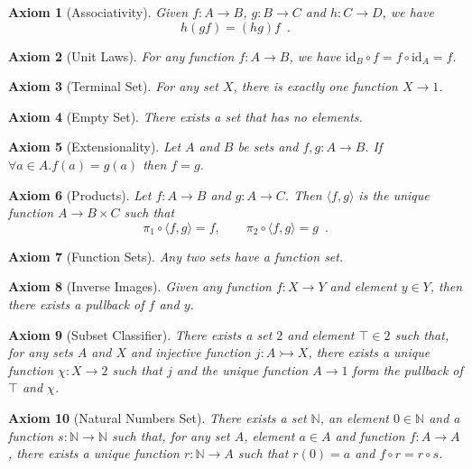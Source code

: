 \documentclass{book}
\newtheorem{ax}{Axiom}[chapter]
\theoremstyle{definition}
\newcommand{\id}[1]{\ensuremath{\mathrm{id}_{#1}}}
\begin{document}
\begin{ax}[Associativity]
Given $f : A \rightarrow B$, $g : B \rightarrow C$ and $h : C \rightarrow D$, we have
\[ h (gf) = (hg) f \enspace . \]
\end{ax}

\begin{ax}[Unit Laws]
For any function $f : A \rightarrow B$, we have $\id{B} \circ f = f \circ \id{A} = f$.
\end{ax}

\begin{ax}[Terminal Set]
For any set $X$, there is exactly one function $X \rightarrow 1$.
\end{ax}

\begin{ax}[Empty Set]
There exists a set that has no elements.
\end{ax}

\begin{ax}[Extensionality]
Let $A$ and $B$ be sets and $f,g : A \rightarrow B$.
If $\forall a \in A. f(a) = g(a)$ then $f = g$. \end{ax}

\begin{ax}[Products]
Let $f : A \rightarrow B$ and $g : A \rightarrow C$. Then $\langle f,g \rangle$ is the unique function $A \rightarrow B \times C$ such that
\[ \pi_1 \circ \langle f,g \rangle = f, \qquad \pi_2 \circ \langle f,g \rangle = g \enspace . \]
\end{ax}

\begin{ax}[Function Sets]
Any two sets have a function set.
\end{ax}

\begin{ax}[Inverse Images]
Given any function $f : X \rightarrow Y$ and element $y \in Y$, then there exists a pullback of $f$ and $y$.
\end{ax}

\begin{ax}[Subset Classifier]
There exists a set $2$ and element $\top \in 2$ such that, for any sets $A$ and $X$ and injective function $j : A \rightarrowtail X$, there exists a unique function $\chi : X \rightarrow 2$ such that $j$ and the unique function $A \rightarrow 1$ form the pullback of $\top$ and $\chi$.
\end{ax}

\begin{ax}[Natural Numbers Set]
There exists a set $\mathbb{N}$, an element $0 \in \mathbb{N}$ and a function $s : \mathbb{N} \rightarrow \mathbb{N}$ such that, for any set $A$, element $a \in A$ and function $f : A \rightarrow A$, there exists a unique function $r : \mathbb{N} \rightarrow A$ such that $r(0) = a$ and $f \circ r = r \circ s$.
\end{ax}
\end{document}
